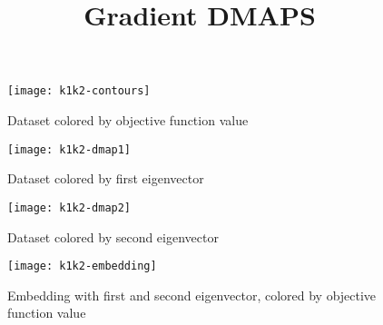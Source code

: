 \documentclass[11pt]{article}
\title{Gradient DMAPS}
\begin{document}
\maketitle

\begin{figure}[htbp]
  \centering
  \texttt{[image: k1k2-contours]}
  \caption{Dataset colored by objective function value}
  \label{"waiting for reftex-label call..."}
\end{figure}

\begin{figure}[htbp]
  \centering
  \texttt{[image: k1k2-dmap1]}
  \caption{Dataset colored by first eigenvector}
  \label{"waiting for reftex-label call..."}
\end{figure}

\begin{figure}[htbp]
  \centering
  \texttt{[image: k1k2-dmap2]}
  \caption{Dataset colored by second eigenvector}
  \label{"waiting for reftex-label call..."}
\end{figure}

\begin{figure}[htbp]
  \centering
  \texttt{[image: k1k2-embedding]}
  \caption{Embedding with first and second eigenvector, colored by objective function value}
  \label{"waiting for reftex-label call..."}
\end{figure}

% 
% 
\end{document}
